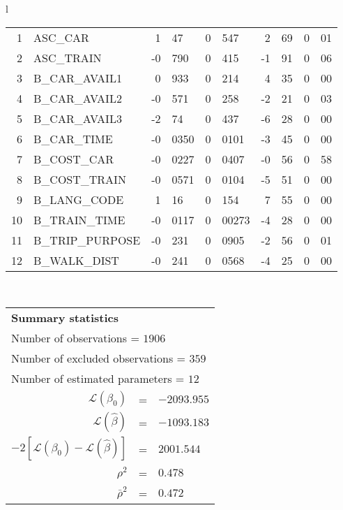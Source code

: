 \begin{tabular}{l}
\begin{tabular}{rlr@{.}lr@{.}lr@{.}lr@{.}l}
1 & ASC_CAR & 1&47 & 0&547 & 2&69 & 0&01\\
2 & ASC_TRAIN & -0&790 & 0&415 & -1&91 & 0&06\\
3 & B_CAR_AVAIL1 & 0&933 & 0&214 & 4&35 & 0&00\\
4 & B_CAR_AVAIL2 & -0&571 & 0&258 & -2&21 & 0&03\\
5 & B_CAR_AVAIL3 & -2&74 & 0&437 & -6&28 & 0&00\\
6 & B_CAR_TIME & -0&0350 & 0&0101 & -3&45 & 0&00\\
7 & B_COST_CAR & -0&0227 & 0&0407 & -0&56 & 0&58\\
8 & B_COST_TRAIN & -0&0571 & 0&0104 & -5&51 & 0&00\\
9 & B_LANG_CODE & 1&16 & 0&154 & 7&55 & 0&00\\
10 & B_TRAIN_TIME & -0&0117 & 0&00273 & -4&28 & 0&00\\
11 & B_TRIP_PURPOSE & -0&231 & 0&0905 & -2&56 & 0&01\\
12 & B_WALK_DIST & -0&241 & 0&0568 & -4&25 & 0&00\\
\hline
\end{tabular}
\\
\begin{tabular}{rcl}
\multicolumn{3}{l}{\bf Summary statistics}\\
\multicolumn{3}{l}{ Number of observations = $1906$} \\
\multicolumn{3}{l}{ Number of excluded observations = $359$} \\
\multicolumn{3}{l}{ Number of estimated  parameters = $12$} \\
 $\mathcal{L}(\beta_0)$ &=&  $-2093.955$ \\
 $\mathcal{L}(\hat{\beta})$ &=& $-1093.183 $  \\
 $-2[\mathcal{L}(\beta_0) -\mathcal{L}(\hat{\beta})]$ &=& $2001.544$ \\
    $\rho^2$ &=&   $0.478$ \\
    $\bar{\rho}^2$ &=&    $0.472$ \\
\end{tabular}
  \end{tabular}
